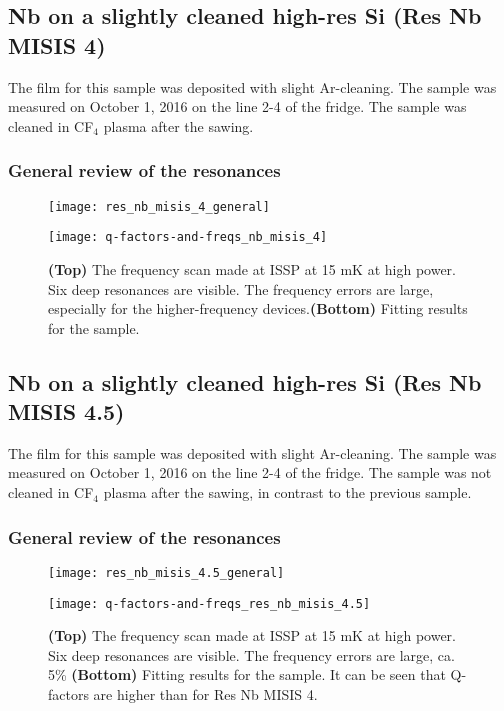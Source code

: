\documentclass[12pt]{article}
\numberwithin{equation}{section}
\numberwithin{figure}{section}
\begin{document}
\subsection{Nb on a slightly cleaned high-res Si (Res Nb MISIS 4)}

The film for this sample was deposited with slight Ar-cleaning. The sample was measured on October 1, 2016 on the line 2-4 of the fridge. The sample was cleaned in CF$_4$ plasma after the sawing.

\subsubsection{General review of the resonances}

\begin{figure}[h!]
\centering
\texttt{[image: res\_nb\_misis\_4\_general]}

\vspace{0.5cm}
\texttt{[image: q-factors-and-freqs\_nb\_misis\_4]}

\caption{\textbf{(Top)} The frequency scan made at ISSP at 15 mK at high power. Six deep resonances are visible. The frequency errors are large, especially for the higher-frequency devices.\textbf{(Bottom)} Fitting results for the sample.}
\end{figure}

\subsection{Nb on a slightly cleaned high-res Si (Res Nb MISIS 4.5)}

The film for this sample was deposited with slight Ar-cleaning. The sample was measured on October 1, 2016 on the line 2-4 of the fridge. The sample was not cleaned in CF$_4$ plasma after the sawing, in contrast to the previous sample.

\subsubsection{General review of the resonances}

\begin{figure}[h!]
\centering
\texttt{[image: res\_nb\_misis\_4.5\_general]}

\vspace{0.5cm}
\texttt{[image: q-factors-and-freqs\_res\_nb\_misis\_4.5]}

\caption{\textbf{(Top)} The frequency scan made at ISSP at 15 mK at high power. Six deep resonances are visible. The frequency errors are large, ca. 5\% \textbf{(Bottom)} Fitting results for the sample. It can be seen that Q-factors are higher than for Res Nb MISIS 4.}
\end{figure}
\end{document}
